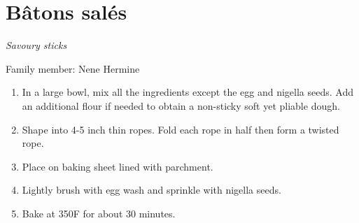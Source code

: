 \chapter{Bâtons salés}
\label{ch:batonsale}
\textit{Savoury sticks}

Family member: Nene Hermine



\begin{enumerate}
    \item In a large bowl, mix all the ingredients except the egg and nigella seeds. Add an additional flour if needed to obtain a non-sticky soft yet pliable dough.
    \item Shape into 4-5 inch thin ropes. Fold each rope in half then form a twisted rope.
    \item Place on baking sheet lined with parchment.
    \item Lightly brush with egg wash and sprinkle with nigella seeds.
    \item Bake at 350\degree F for about 30 minutes.
\end{enumerate}

